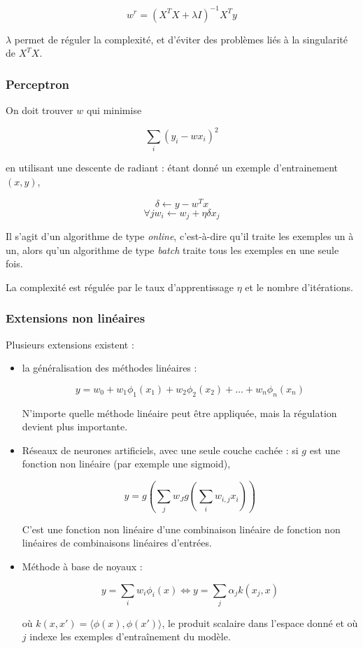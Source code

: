 	$$w^r = (X^T X + \lambda I)^{-1}X^Ty$$
	
	$\lambda$ permet de réguler la complexité, et d'éviter des problèmes liés à la singularité de $X^TX$.
	
	\subsubsection{Perceptron}
	
	On doit trouver $w$ qui minimise
	
	$$\sum_i (y_i - wx_i)^2$$
	
	en utilisant une descente de radiant : étant donné un exemple d'entrainement $(x, y)$,
	
	$$\delta \leftarrow y - w^Tx$$
	$$\forall jw_i \leftarrow w_j + \eta \delta x_j$$
	
	Il s'agit d'un algorithme de type \textit{online}, c'est-à-dire qu'il traite les exemples un à un, alors qu'un algorithme de type \textit{batch} traite tous les exemples en une seule fois.
	
	La complexité est régulée par le taux d'apprentissage $\eta$ et le nombre d'itérations.
	
	\subsubsection{Extensions non linéaires}
	
	Plusieurs extensions existent :
	
	\begin{itemize}
		\item la généralisation des méthodes linéaires :
		
		$$y = w_0 + w_1 \phi_1(x_1) + w_2 \phi_2(x_2) + \dots + w_n \phi_n(x_n)$$
		
		N'importe quelle méthode linéaire peut être appliquée, mais la régulation devient plus importante.
		
		\item Réseaux de neurones artificiels, avec une seule couche cachée : si $g$ est une fonction non linéaire (par exemple une sigmoid),
		
		$$y = g(\sum_j w_J g(\sum_i w_{i, j} x_i))$$
		
		C'est une fonction non linéaire d'une combinaison linéaire de fonction non linéaires de combinaisons linéaires d'entrées.
		
		\item Méthode à base de noyaux :
		
		$$y = \sum_i w_i \phi_i(x) \Leftrightarrow y = \sum_j \alpha_j k(x_j, x)$$
		
		où $k(x, x') = \langle \phi(x), \phi(x') \rangle$, le produit scalaire dans l'espace donné et où $j$ indexe les exemples d'entraînement du modèle.
	\end{itemize}

